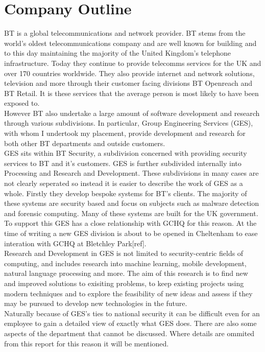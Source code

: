 \documentclass[a4paper,11pt]{report}
\title{}
\author{}
\begin{document}
\maketitle
\tableofcontents

\begin{abstract}
\end{abstract}

\chapter{Company Outline}
BT is a global telecommunications and network provider. BT stems from the world's oldest telecommunications company and are well known for building and to this day maintaining the majority of the United Kingdom's telephone infrastructure. Today they continue to provide telecomms services for the UK and over 170 countries worldwide. They also provide internet and network solutions, television and more through their customer facing divisions BT Openreach and BT Retail. It is these services that the average person is most likely to have been exposed to.\\
However BT also undertake a large amount of software development and research through various subdivisions. In particular, Group Engineering Services (GES), with whom I undertook my placement, provide development and research for both other BT departments and outside customers.\\
GES sits within BT Security, a subdivision concerned with providing security services to BT and it's customers. GES is further subdivided internally into Processing and Research and Development. These subdivisions in many cases are not clearly seperated so instead it is easier to describe the work of GES as a whole. Firstly they develop bespoke systems for BT's clients. The majority of these systems are security based and focus on subjects such as malware detection and forensic computing. Many of these systems are built for the UK government. To support this GES has a close relationship with GCHQ for this reason. At the time of writing a new GES division is about to be opened in Cheltenham to ease interation with GCHQ at Bletchley Park[ref].\\

Research and Development in GES is not limited to security-centric fields of computing, and includes research into machine learning, mobile development, natural language processing and more. The aim of this research is to find new and improved solutions to exisiting problems, to keep existing projects using modern techniques and to explore the feasibility of new ideas and assess if they may be pursued to develop new technologies in the future.\\
Naturally because of GES's ties to national security it can be difficult even for an employee to gain a detailed view of exactly what GES does. There are also some aspects of the department that cannot be discussed. Where details are ommited from this report for this reason it will be mentioned.\\
\end{document}
